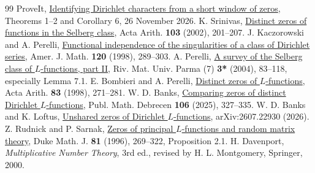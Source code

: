 \documentclass[11pt]{article}
\begin{document}
\begin{thebibliography}{99}
 ProveIt, \href{https://github.com/VladimirReshetnikov/ProveIt/blob/b29490a150d3947b114d6c9daf3398300537eb64/Analysis/GeneralizedRiemannHypothesis/docs/incoming/local_euler_recovery.zip}{Identifying Dirichlet characters from a short window of zeros}, Theorems 1--2 and Corollary 6, 26 November 2026.
 K. Srinivas, \href{https://doi.org/10.4064/aa103-3-1}{Distinct zeros of functions in the Selberg class}, Acta Arith. \textbf{103} (2002), 201--207.
 J. Kaczorowski and A. Perelli, \href{https://doi.org/10.1353/ajm.1998.0012}{Functional independence of the singularities of a class of Dirichlet series}, Amer. J. Math. \textbf{120} (1998), 289--303.
 A. Perelli, \href{https://www.rivmat.unipr.it/fulltext/2004-3s/pdf/04.pdf}{A survey of the Selberg class of $L$-functions, part II}, Riv. Mat. Univ. Parma (7) \textbf{3*} (2004), 83--118, especially Lemma 7.1.
 E. Bombieri and A. Perelli, \href{https://matwbn.icm.edu.pl/ksiazki/aa/aa83/aa8336.pdf}{Distinct zeros of $L$-functions}, Acta Arith. \textbf{83} (1998), 271--281.
 W. D. Banks, \href{https://arxiv.org/abs/2302.07073}{Comparing zeros of distinct Dirichlet $L$-functions}, Publ. Math. Debrecen \textbf{106} (2025), 327--335.
 W. D. Banks and K. Loftus, \href{https://arxiv.org/abs/2607.22930}{Unshared zeros of Dirichlet $L$-functions}, arXiv:2607.22930 (2026).
 Z. Rudnick and P. Sarnak, \href{https://doi.org/10.1215/S0012-7094-96-08115-6}{Zeros of principal $L$-functions and random matrix theory}, Duke Math. J. \textbf{81} (1996), 269--322, Proposition 2.1.
 H. Davenport, \emph{Multiplicative Number Theory}, 3rd ed., revised by H. L. Montgomery, Springer, 2000.
\end{thebibliography}
\end{document}
